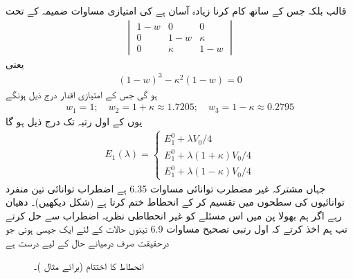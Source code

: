قالب  بلکہ  جس کے ساتھ کام کرنا زیادہ آسان ہے کی امتیازی مساوات ضمیمہ  کے تحت
\begin{align*}
\begin{vmatrix}
1 - w & 0 & 0 \\
0 & 1 - w& \kappa \\
0 & \kappa & 1 - w
\end{vmatrix}
\end{align*}
یعنی
\begin{align*}
(1 - w)^3 - \kappa^2 (1 - w) = 0
\end{align*}
ہو گی جس کے امتیازی اقدار درج ذیل ہونگے 
\begin{align*}
w_1 = 1; \quad w_2 = 1+ \kappa \approx 1.7205; \quad w_3 = 1 - \kappa \approx 0.2795
\end{align*}
یوں  کے اول رتبہ تک درج ذیل ہو گا 
\begin{align}
E_1 (\lambda) = 
\begin{cases}
E_1^0 + \lambda V_0/4 \\
E_1^0 + \lambda (1+ \kappa) V_0 /4 \\
E_1^0 + \lambda (1 - \kappa) V_0 /4
\end{cases}
\end{align}
جہاں  مشترکہ غیر مضطرب توانائی مساوات 6.35 ہے اضطراب توانائی  تین منفرد توانائیوں کی سطحوں میں تقسیم کر کے انحطاط ختم  کرتا ہے  (شکل  دیکھیں)۔  دھیان رہے اگر ہم بھولا پن میں اس مسئلے کو غیر انحطاطی نظریہ اضطراب سے حل کرتے تب ہم اخذ کرتے کہ اول رتبی تصحیح مساوات 6.9 تینوں حالات کے لئے ایک جیسی  ہوتی جو درحقیقت صرف درمیانے حال کے لیے درست ہے 

\begin{figure}
\centering
{}
\caption{انحطاط کا اختتام (برائے مثال )۔}
\label{شکل_غیر_تابع_اضطراب_انحطاط_اختتام_مثال}
\end{figure}


